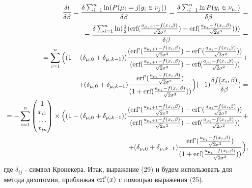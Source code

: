 \documentclass[12pt]{article}
\begin{document}
\begin{eqnarray}
    \frac{\delta l}{\delta \beta}=\frac{\delta \sum_{i=1}^{n}\ln(P(\mu_i=j|y_i\in \nu_j))}{\delta \beta}=\frac{\delta \sum_{i=1}^{n}\ln P(y_i\in \nu_{\mu_i})}{\delta \beta}=\\
    =\frac{\delta \sum_{i=1}^{n} \ln(\frac{1}{2}(\textup{erf}(\frac{a_{\mu_i+1}-f(x_i,\beta)}{\sqrt{2}\sigma^2})-\textup{erf}(\frac{a_{\mu_i}-f(x_i,\beta)}{\sqrt{2}\sigma^2})) )         }{\delta \beta}=\\
    =  \sum_{i=1}^{n}\Big((1-(\delta_{\mu_i 0}+\delta_{\mu_i k-1}))\frac{(\textup{erf'}(\frac{a_{\mu_i+1}-f(x_i,\beta)}{\sqrt{2}\sigma^2})-\textup{erf'}(\frac{a_{\mu_i}-f(x_i,\beta)}{\sqrt{2}\sigma^2}))}{ (\textup{erf}(\frac{a_{\mu_i+1}-f(x_i,\beta)}{\sqrt{2}\sigma^2})-\textup{erf}(\frac{a_{\mu_i}-f(x_i,\beta)}{\sqrt{2}\sigma^2}))}+\\
    \nonumber +(\delta_{\mu_i 0}+\delta_{\mu_i k-1})\frac{\textup{erf'}(\frac{a_{\mu_i}-f(x_i,\beta)}{\sqrt{2}\sigma^2})}{(1+\textup{erf}(\frac{a_{\mu_i}-f(x_i,\beta)}{\sqrt{2}\sigma^2}))}\Big)  (-1) \frac{\delta f(x_i,\beta)}{\delta \beta} )=\\
    =-\sum_{i=1}^{n}\begin{pmatrix}
        1\\
        x_{i1}\\
        \dots\\
        x_{in}
    \end{pmatrix}\times  \Big((1-(\delta_{\mu_i 0}+\delta_{\mu_i k-1}))\frac{(\textup{erf'}(\frac{a_{\mu_i+1}-f(x_i,\beta)}{\sqrt{2}\sigma^2})-\textup{erf'}(\frac{a_{\mu_i}-f(x_i,\beta)}{\sqrt{2}\sigma^2}))}{ (\textup{erf}(\frac{a_{\mu_i+1}-f(x_i,\beta)}{\sqrt{2}\sigma^2})-\textup{erf}(\frac{a_{\mu_i}-f(x_i,\beta)}{\sqrt{2}\sigma^2}))}+\\
    \nonumber +(\delta_{\mu_i 0}+\delta_{\mu_i k-1})\frac{\textup{erf'}(\frac{a_{\mu_i}-f(x_i,\beta)}{\sqrt{2}\sigma^2})}{(1+\textup{erf}(\frac{a_{\mu_i}-f(x_i,\beta)}{\sqrt{2}\sigma^2}))}\Big)  ,
\end{eqnarray}
где $\delta_{ij}$ - символ Кронекера.\hfill\break
Итак, выражение (29) и будем использовать для метода дихотомии, приближая $\textup{erf}'(x)$ с помощью выражения (25).
\end{document}
